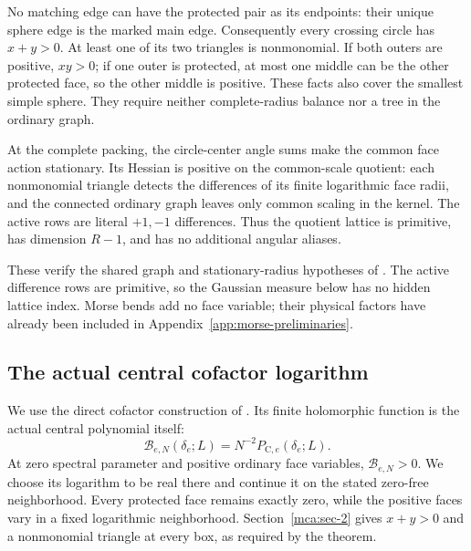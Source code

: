 No matching edge can have the protected pair as its endpoints: their
unique sphere edge is the marked main edge. Consequently every crossing
circle has \(x+y>0\). At least one of its two triangles is nonmonomial.
If both outers are positive, \(xy>0\); if one outer is protected, at
most one middle can be the other protected face, so the other middle is
positive. These facts also cover the smallest simple sphere. They
require neither complete-radius balance nor a tree in the ordinary
graph.

At the complete packing, the circle-center angle sums make the
common face action stationary. Its Hessian is positive on the
common-scale quotient: each nonmonomial triangle detects the differences
of its finite logarithmic face radii, and the connected ordinary graph
leaves only common scaling in the kernel. The active rows are literal
\(+1,-1\) differences. Thus the quotient lattice is primitive, has
dimension \(R-1\), and has no additional angular aliases.

These verify the shared graph and stationary-radius hypotheses of
\cite[Theorem~8.1]{CasimirSources}. The active difference rows are
primitive, so the Gaussian measure below has no hidden lattice index.
Morse bends add no face variable; their physical factors have already
been included in Appendix~\ref{app:morse-preliminaries}.

\subsection{The actual central cofactor logarithm}
\label{mca:sec-3}

We use the direct cofactor construction of
\cite[Proposition~10.1 and Theorem~8.1]{CasimirSources}. Its finite
holomorphic function is the actual central polynomial itself:
\begin{equation}\label{mca:eq-7}
 \mathcal B_{e,N}(\delta_e;L)
       =N^{-2}P_{\mathrm C,e}(\delta_e;L).
\end{equation}
At zero spectral parameter and positive ordinary face variables,
$\mathcal B_{e,N}>0$. We choose its logarithm to be real there and
continue it on the stated zero-free neighborhood. Every protected
face remains exactly zero, while the positive faces vary in a fixed
logarithmic neighborhood. Section~\ref{mca:sec-2} gives \(x+y>0\)
and a nonmonomial triangle at every box, as required by the theorem.

